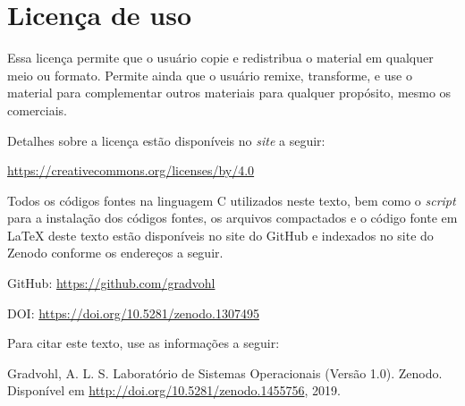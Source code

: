 \chapter*{Licença de uso}\label{chp:licenca}
\doclicenseThis

Essa licença permite que o usuário copie e redistribua o material em qualquer meio ou formato. Permite ainda que o usuário remixe, transforme, e use o material para complementar outros materiais para qualquer propósito, mesmo os comerciais.

 Detalhes sobre a licença estão disponíveis no \textit{site} a seguir:
 \begin{center}
    \url{https://creativecommons.org/licenses/by/4.0}     
 \end{center}

Todos os códigos fontes na linguagem C utilizados neste texto, bem como o \textit{script} para a instalação dos códigos fontes, os arquivos compactados e o código fonte em \LaTeX{} deste texto estão disponíveis no site do GitHub e indexados no site do Zenodo conforme os endereços a seguir.

GitHub: \url{https://github.com/gradvohl}

DOI: \url{https://doi.org/10.5281/zenodo.1307495}

Para citar este texto, use as informações a seguir:

\noindent
{\sc Gradvohl, A. L. S.} Laboratório de Sistemas Operacionais (Versão 1.0). Zenodo. Disponível em \url{http://doi.org/10.5281/zenodo.1455756}, 2019.
